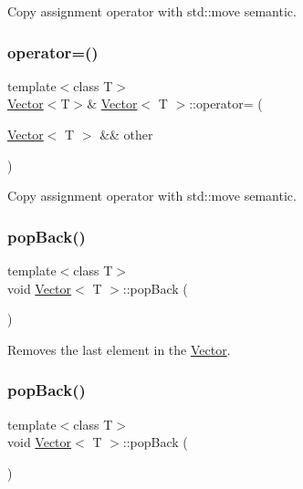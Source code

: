 Copy assignment operator with std\+::move semantic. \mbox{\label{classVector_ac4cedd399454463a0e9bdf6defd09a04}} 
\subsubsection{\texorpdfstring{operator=()}{operator=()}\hspace{0.1cm}{\footnotesize\ttfamily [4/4]}}
{\footnotesize\ttfamily template$<$class T$>$ \\
\hyperlink{classVector}{Vector}$<$T$>$\& \hyperlink{classVector}{Vector}$<$ T $>$\+::operator= (\begin{DoxyParamCaption}\item[{\hyperlink{classVector}{Vector}$<$ T $>$ \&\&}]{other }\end{DoxyParamCaption})\hspace{0.3cm}{\ttfamily [inline]}}

Copy assignment operator with std\+::move semantic. \mbox{\label{classVector_a91c45b15e4cff53bad3628b75382793f}} 
\subsubsection{\texorpdfstring{pop\+Back()}{popBack()}\hspace{0.1cm}{\footnotesize\ttfamily [1/2]}}
{\footnotesize\ttfamily template$<$class T$>$ \\
void \hyperlink{classVector}{Vector}$<$ T $>$\+::pop\+Back (\begin{DoxyParamCaption}{ }\end{DoxyParamCaption})\hspace{0.3cm}{\ttfamily [inline]}}

Removes the last element in the \hyperlink{classVector}{Vector}. \mbox{\label{classVector_a91c45b15e4cff53bad3628b75382793f}} 
\subsubsection{\texorpdfstring{pop\+Back()}{popBack()}\hspace{0.1cm}{\footnotesize\ttfamily [2/2]}}
{\footnotesize\ttfamily template$<$class T$>$ \\
void \hyperlink{classVector}{Vector}$<$ T $>$\+::pop\+Back (\begin{DoxyParamCaption}{ }\end{DoxyParamCaption})\hspace{0.3cm}{\ttfamily [inline]}}

